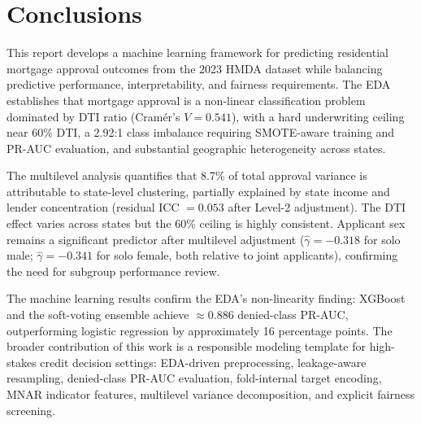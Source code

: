 \documentclass[12pt,letterpaper]{article}
\begin{document}
\section{Conclusions}

This report develops a machine learning framework for predicting residential mortgage approval
outcomes from the 2023 HMDA dataset while balancing predictive performance, interpretability,
and fairness requirements. The EDA establishes that mortgage approval is a non-linear
classification problem dominated by DTI ratio (Cram\'{e}r's $V = 0.541$), with a hard
underwriting ceiling near 60\% DTI, a 2.92:1 class imbalance requiring SMOTE-aware training
and PR-AUC evaluation, and substantial geographic heterogeneity across states.

The multilevel analysis quantifies that 8.7\% of total approval variance is attributable to
state-level clustering, partially explained by state income and lender concentration (residual
ICC $= 0.053$ after Level-2 adjustment). The DTI effect varies across states but the 60\%
ceiling is highly consistent. Applicant sex remains a significant predictor after multilevel
adjustment ($\hat{\gamma} = -0.318$ for solo male; $\hat{\gamma} = -0.341$ for solo female,
both relative to joint applicants), confirming the need for subgroup performance review.

The machine learning results confirm the EDA's non-linearity finding: XGBoost and the
soft-voting ensemble achieve $\approx 0.886$ denied-class PR-AUC, outperforming logistic
regression by approximately 16 percentage points. The broader contribution of this work is a
responsible modeling template for high-stakes credit decision settings: EDA-driven preprocessing,
leakage-aware resampling, denied-class PR-AUC evaluation, fold-internal target encoding, MNAR
indicator features, multilevel variance decomposition, and explicit fairness screening.
\end{document}
